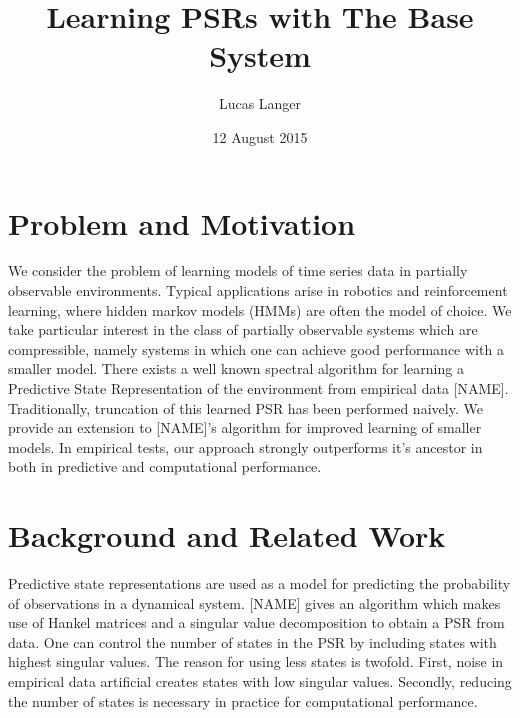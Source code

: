 \documentclass{acm_proc_article-sp}
\begin{document}
\title{Learning PSRs with The Base System}


\author{
\alignauthor
Lucas Langer\\
}

\date{12 August 2015}

\maketitle

\section{Problem and Motivation}


We consider the problem of learning models of time series data in partially observable environments. Typical applications arise in robotics and reinforcement learning, where hidden markov models (HMMs) are often the model of choice. We take particular interest in the class of partially observable systems which are compressible, namely systems in which one can achieve good performance with a smaller model. There exists a well known spectral algorithm for learning a Predictive State Representation of the environment from empirical data [NAME]. Traditionally, truncation of this learned PSR has been performed naively. We provide an extension to [NAME]'s algorithm for improved learning of smaller models. In empirical tests, our approach strongly outperforms it's ancestor in both in predictive and computational performance.

\section{Background and Related Work}

Predictive state representations are used as a model for predicting the probability of observations in a dynamical system. [NAME] gives an algorithm which makes use of Hankel matrices and a singular value decomposition to obtain a PSR from data. One can control the number of states in the PSR by including states with highest singular values. The reason for using less states is twofold. First, noise in empirical data artificial creates states with low singular values. Secondly, reducing the number of states is necessary in practice for computational performance. 
\end{document}
